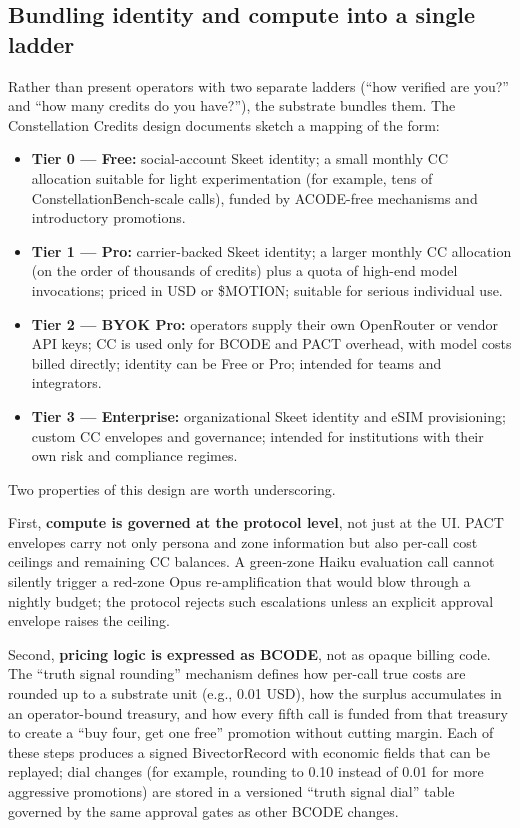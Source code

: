 \documentclass{article}
\providecommand{\tightlist}{\setlength{\itemsep}{0pt}\setlength{\parskip}{0pt}}
\begin{document}
\subsection{Bundling identity and compute into a single
ladder}\label{bundling-identity-and-compute-into-a-single-ladder}

Rather than present operators with two separate ladders (``how verified
are you?'' and ``how many credits do you have?''), the substrate bundles
them. The Constellation Credits design documents sketch a mapping of the
form:

\begin{itemize}
\tightlist
\item
  \textbf{Tier 0 --- Free:} social-account Skeet identity; a small
  monthly CC allocation suitable for light experimentation (for example,
  tens of ConstellationBench-scale calls), funded by ACODE-free
  mechanisms and introductory promotions.
\item
  \textbf{Tier 1 --- Pro:} carrier-backed Skeet identity; a larger
  monthly CC allocation (on the order of thousands of credits) plus a
  quota of high-end model invocations; priced in USD or \$MOTION;
  suitable for serious individual use.
\item
  \textbf{Tier 2 --- BYOK Pro:} operators supply their own OpenRouter or
  vendor API keys; CC is used only for BCODE and PACT overhead, with
  model costs billed directly; identity can be Free or Pro; intended for
  teams and integrators.
\item
  \textbf{Tier 3 --- Enterprise:} organizational Skeet identity and eSIM
  provisioning; custom CC envelopes and governance; intended for
  institutions with their own risk and compliance regimes.
\end{itemize}

Two properties of this design are worth underscoring.

First, \textbf{compute is governed at the protocol level}, not just at
the UI. PACT envelopes carry not only persona and zone information but
also per-call cost ceilings and remaining CC balances. A green-zone
Haiku evaluation call cannot silently trigger a red-zone Opus
re-amplification that would blow through a nightly budget; the protocol
rejects such escalations unless an explicit approval envelope raises the
ceiling.

Second, \textbf{pricing logic is expressed as BCODE}, not as opaque
billing code. The ``truth signal rounding'' mechanism defines how
per-call true costs are rounded up to a substrate unit (e.g., 0.01 USD),
how the surplus accumulates in an operator-bound treasury, and how every
fifth call is funded from that treasury to create a ``buy four, get one
free'' promotion without cutting margin. Each of these steps produces a
signed BivectorRecord with economic fields that can be replayed; dial
changes (for example, rounding to 0.10 instead of 0.01 for more
aggressive promotions) are stored in a versioned ``truth signal dial''
table governed by the same approval gates as other BCODE changes.
\end{document}

